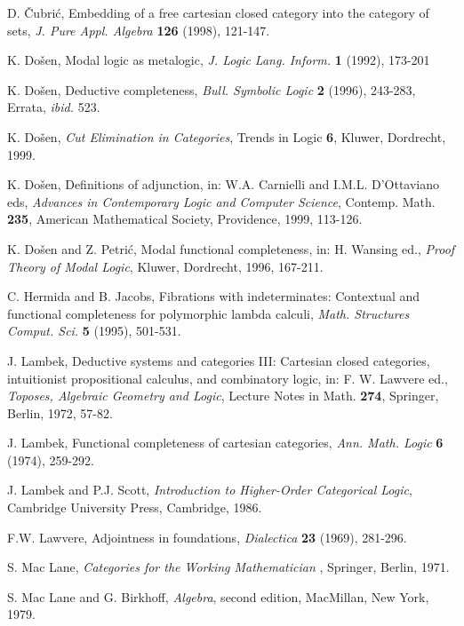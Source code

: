 \documentclass[12pt]{article}
\begin{document}
\begin{thebibliography}{99}
  D. \v {C}ubri\'{c}, Embedding of a free cartesian closed
category into the category of sets, {\it J. Pure Appl. Algebra} {\bf 126}
(1998), 121-147.

  K. Do\v {s}en, Modal logic as metalogic, {\it J. Logic Lang.
Inform.} {\bf 1 }(1992), 173-201

  K. Do\v {s}en, Deductive completeness, {\it Bull. Symbolic
Logic} {\bf 2 }(1996), 243-283, Errata, {\it ibid.} 523.

  K. Do\v {s}en, {\it Cut Elimination in Categories}, Trends
in Logic {\bf 6}, Kluwer, Dordrecht, 1999.

  K. Do\v {s}en, Definitions of adjunction, in: W.A.
Carnielli and I.M.L. D'Ottaviano eds, {\it Advances in Contemporary Logic
and Computer Science}, Contemp. Math. {\bf 235}, American Mathematical
Society, Providence, 1999, 113-126.

  K. Do\v {s}en and Z. Petri\'{c}, Modal functional
completeness, in: H. Wansing ed., {\it Proof Theory of Modal Logic}, Kluwer,
Dordrecht, 1996, 167-211.

  C. Hermida and B. Jacobs, Fibrations with indeterminates:
Contextual and functional completeness for polymorphic lambda calculi, {\it %
Math. Structures Comput. Sci.} {\bf 5} (1995), 501-531.

  J. Lambek, Deductive systems and categories III: Cartesian
closed categories, intuitionist propositional calculus, and combinatory
logic, in: F. W. Lawvere ed., {\it Toposes, Algebraic Geometry and Logic},
Lecture Notes in Math. {\bf 274}, Springer, Berlin, 1972, 57-82.

  J. Lambek, Functional completeness of cartesian categories, 
{\it Ann. Math. Logic} {\bf 6} (1974), 259-292.

  J. Lambek and P.J. Scott, {\it Introduction to Higher-Order
Categorical Logic}, Cambridge University Press, Cambridge, 1986.

  F.W. Lawvere, Adjointness in foundations, {\it Dialectica} 
{\bf 23} (1969), 281-296.

  S. Mac Lane, {\it Categories for the Working Mathematician}%
, Springer, Berlin, 1971.

  S. Mac Lane and G. Birkhoff, {\it Algebra}, second
edition, MacMillan, New York, 1979.
\end{thebibliography}
\end{document}
